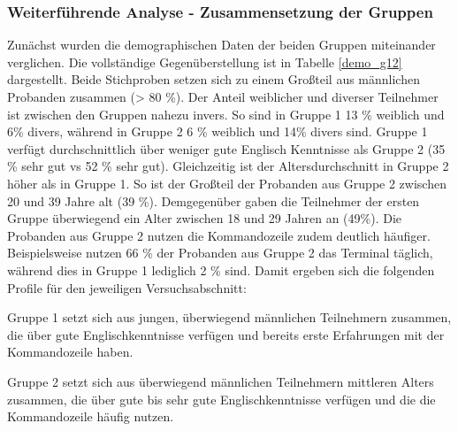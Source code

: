 \subsubsection{Weiterführende Analyse - Zusammensetzung der Gruppen}
Zunächst wurden die demographischen Daten der beiden Gruppen miteinander verglichen. Die vollständige Gegenüberstellung ist in Tabelle \ref{demo_g12} dargestellt. Beide Stichproben setzen sich zu einem Großteil aus männlichen Probanden zusammen (> 80 \%). Der Anteil weiblicher und diverser Teilnehmer ist zwischen den Gruppen nahezu invers. So sind in Gruppe 1 13 \% weiblich und 6\% divers, während in Gruppe 2 6 \% weiblich und 14\% divers sind. Gruppe 1 verfügt durchschnittlich über weniger gute Englisch Kenntnisse als Gruppe 2 (35 \% sehr gut vs 52 \% sehr gut). Gleichzeitig ist der Altersdurchschnitt in Gruppe 2 höher als in Gruppe 1. So ist der Großteil der Probanden aus Gruppe 2 zwischen 20 und 39 Jahre alt (39 \%). Demgegenüber gaben die Teilnehmer der ersten Gruppe überwiegend ein Alter zwischen 18 und 29 Jahren an (49\%). Die Probanden aus Gruppe 2 nutzen die Kommandozeile zudem deutlich häufiger. Beispielsweise nutzen 66 \% der Probanden aus Gruppe 2 das Terminal täglich, während dies in Gruppe 1 lediglich 2 \% sind. Damit ergeben sich die folgenden Profile für den jeweiligen Versuchsabschnitt:

Gruppe 1 setzt sich aus jungen, überwiegend männlichen Teilnehmern zusammen, die über gute Englischkenntnisse verfügen und bereits erste Erfahrungen mit der Kommandozeile haben. 

Gruppe 2 setzt sich aus überwiegend männlichen Teilnehmern mittleren Alters zusammen, die über gute bis sehr gute Englischkenntnisse verfügen und die die Kommandozeile häufig nutzen. 

